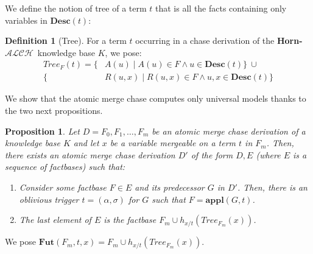 \documentclass{article}
\newtheorem{proposition}{Proposition}[section]
\theoremstyle{definition}
\newtheorem{definition}{Definition}[section]
\theoremstyle{remark}
\newcommand{\Appl}{\textbf{appl}}
\newcommand{\Tree}{\textit{Tree}}
\newcommand{\Fut}{\textbf{Fut}}
\newcommand{\des}{\textbf{Desc}}
\newcommand{\ALCH}{\textbf{Horn-$\mathcal{ALCH}$}}
\begin{document}

We define the notion of tree of a term $t$ that is all the facts containing only variables in $\des(t)$:

\begin{definition}[Tree]
For a term $t$ occurring in a chase derivation of the \ALCH\ knowledge base $K$, we pose:
\begin{align*}
	\Tree_{F}(t) = \{&A(u) \mid A(u) \in F \wedge u \in \des(t)\}~\cup \\
	\{&R(u,x) \mid R(u,x) \in F \wedge u,x \in \des(t)\}
\end{align*}
\end{definition}




We show that the atomic merge chase computes only universal models thanks to the two next propositions.

\begin{proposition} \label{step1}
	Let $D = F_0,F_1,\ldots,F_m$ be an atomic merge chase derivation of a knowledge base $K$
	and let $x$ be a variable mergeable on a term $t$ in $F_m$.
	Then, there exists an atomic merge chase derivation $D'$ of the form $D, E$ (where $E$ is a sequence of factbases) such that:
	\begin{enumerate}
	\item Consider some factbase $F \in E$ and its predecessor $G$ in $D'$.
	Then, there is an oblivious trigger $t = (\alpha, \sigma)$ for $G$ such that $F = \Appl(G, t)$.
	\item The last element of $E$ is the factbase $F_m \cup h_{x/t}(\Tree_{F_m}(x))$. 
	\end{enumerate}
	\end{proposition}

We pose \emph{$\Fut(F_m,t,x) = F_m \cup h_{x/t}(\Tree_{F_m}(x))$}.
	
\end{document}
